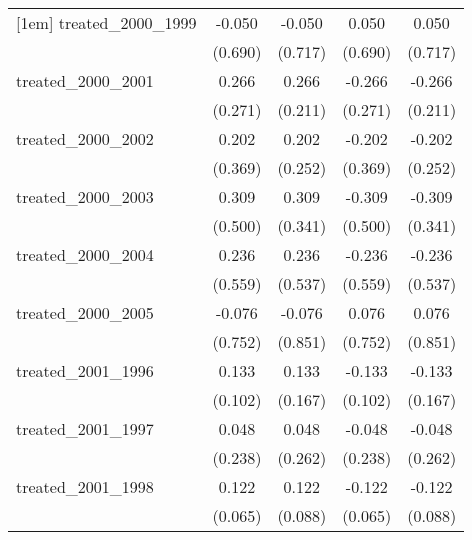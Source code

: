 {\begin{tabular}{l*{4}{c}}
[1em]
treated\_2000\_1999&      -0.050         &      -0.050         &       0.050         &       0.050         \\
            &     (0.690)         &     (0.717)         &     (0.690)         &     (0.717)         \\
[1em]
treated\_2000\_2001&       0.266         &       0.266         &      -0.266         &      -0.266         \\
            &     (0.271)         &     (0.211)         &     (0.271)         &     (0.211)         \\
[1em]
treated\_2000\_2002&       0.202         &       0.202         &      -0.202         &      -0.202         \\
            &     (0.369)         &     (0.252)         &     (0.369)         &     (0.252)         \\
[1em]
treated\_2000\_2003&       0.309         &       0.309         &      -0.309         &      -0.309         \\
            &     (0.500)         &     (0.341)         &     (0.500)         &     (0.341)         \\
[1em]
treated\_2000\_2004&       0.236         &       0.236         &      -0.236         &      -0.236         \\
            &     (0.559)         &     (0.537)         &     (0.559)         &     (0.537)         \\
[1em]
treated\_2000\_2005&      -0.076         &      -0.076         &       0.076         &       0.076         \\
            &     (0.752)         &     (0.851)         &     (0.752)         &     (0.851)         \\
[1em]
treated\_2001\_1996&       0.133         &       0.133         &      -0.133         &      -0.133         \\
            &     (0.102)         &     (0.167)         &     (0.102)         &     (0.167)         \\
[1em]
treated\_2001\_1997&       0.048         &       0.048         &      -0.048         &      -0.048         \\
            &     (0.238)         &     (0.262)         &     (0.238)         &     (0.262)         \\
[1em]
treated\_2001\_1998&       0.122         &       0.122         &      -0.122         &      -0.122         \\
            &     (0.065)         &     (0.088)         &     (0.065)         &     (0.088)         \\

\end{tabular}}
